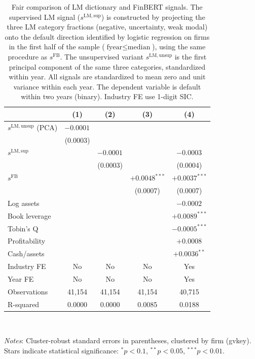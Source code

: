 \begin{table}[htbp]
\centering
\caption{Fair comparison of LM dictionary and FinBERT signals. The supervised LM signal ($s^{\mathrm{LM,sup}}$) is constructed by projecting the three LM category fractions (negative, uncertainty, weak modal) onto the default direction identified by logistic regression on firms in the first half of the sample ($\text{fyear} \le \text{median}$), using the same procedure as $s^{\mathrm{FB}}$. The unsupervised variant $s^{\mathrm{LM,unsup}}$ is the first principal component of the same three categories, standardized within year. All signals are standardized to mean zero and unit variance within each year. The dependent variable is default within two years (binary). Industry FE use 1-digit SIC.}
\label{tab:t9_supervised_lm}
\small
\begin{tabular}{lcccc}
\toprule
 & (1) & (2) & (3) & (4) \\
\midrule
$s^{\mathrm{LM,unsup}}$ (PCA) & $-0.0001^{}$ &  &  &  \\
 & (0.0003) &  &  &  \\
$s^{\mathrm{LM,sup}}$ &  & $-0.0001^{}$ &  & $-0.0003^{}$ \\
 &  & (0.0003) &  & (0.0004) \\
$s^{\mathrm{FB}}$ &  &  & $+0.0048^{***}$ & $+0.0037^{***}$ \\
 &  &  & (0.0007) & (0.0007) \\
\midrule
Log assets &  &  &  & $-0.0002^{}$ \\
Book leverage &  &  &  & $+0.0089^{***}$ \\
Tobin's Q &  &  &  & $-0.0005^{***}$ \\
Profitability &  &  &  & $+0.0008^{}$ \\
Cash/assets &  &  &  & $+0.0036^{**}$ \\
\midrule
Industry FE & No & No & No & Yes \\
Year FE & No & No & No & Yes \\
\midrule
Observations & 41,154 & 41,154 & 41,154 & 40,715 \\
R-squared & 0.0000 & 0.0000 & 0.0085 & 0.0188 \\
\bottomrule
\end{tabular}
\\[-2ex]
\begin{flushleft}
\footnotesize
\textit{Notes}: Cluster-robust standard errors in parentheses, clustered by firm (gvkey). Stars indicate statistical significance: $^{*}p<0.1$, $^{**}p<0.05$, $^{***}p<0.01$.
\end{flushleft}
\end{table}